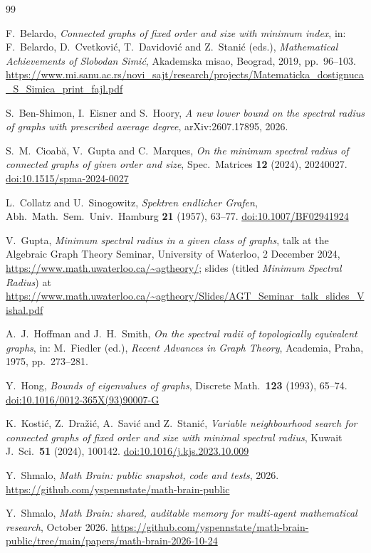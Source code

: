 \documentclass[11pt]{article}
\theoremstyle{definition}
\theoremstyle{remark}
\providecommand{\doi}[1]{\href{https://doi.org/#1}{doi:#1}}
\begin{document}
\begin{thebibliography}{99}

F.~Belardo, \emph{Connected graphs of fixed order and size with minimum index}, in: F.~Belardo, D.~Cvetkovi\'c,
T.~Davidovi\'c and Z.~Stani\'c (eds.), \emph{Mathematical Achievements of Slobodan Simi\'c}, Akademska misao, Beograd,
2019, pp.~96--103.
\url{https://www.mi.sanu.ac.rs/novi_sajt/research/projects/Matematicka_dostignuca_S_Simica_print_fajl.pdf}

S.~Ben-Shimon, I.~Eisner and S.~Hoory, \emph{A new lower bound on the spectral radius of graphs with prescribed average
degree}, arXiv:2607.17895, 2026.

S.~M.~Cioab\u{a}, V.~Gupta and C.~Marques, \emph{On the minimum spectral radius of connected graphs of given order and
size}, Spec.\ Matrices \textbf{12} (2024), 20240027. \doi{10.1515/spma-2024-0027}

L.~Collatz and U.~Sinogowitz, \emph{Spektren endlicher Grafen}, Abh.\ Math.\ Sem.\ Univ.\ Hamburg \textbf{21} (1957),
63--77. \doi{10.1007/BF02941924}

V.~Gupta, \emph{Minimum spectral radius in a given class of graphs}, talk at the Algebraic Graph Theory Seminar,
University of Waterloo, 2 December 2024, \url{https://www.math.uwaterloo.ca/~agtheory/}; slides (titled
\emph{Minimum Spectral Radius}) at
\url{https://www.math.uwaterloo.ca/~agtheory/Slides/AGT_Seminar_talk_slides_Vishal.pdf}

A.~J.~Hoffman and J.~H.~Smith, \emph{On the spectral radii of topologically equivalent graphs}, in: M.~Fiedler (ed.),
\emph{Recent Advances in Graph Theory}, Academia, Praha, 1975, pp.~273--281.

Y.~Hong, \emph{Bounds of eigenvalues of graphs}, Discrete Math.\ \textbf{123} (1993), 65--74.
\doi{10.1016/0012-365X(93)90007-G}

K.~Kosti\'c, Z.~Dra\v{z}i\'c, A.~Savi\'c and Z.~Stani\'c, \emph{Variable neighbourhood search for connected graphs of
fixed order and size with minimal spectral radius}, Kuwait J.\ Sci.\ \textbf{51} (2024), 100142.
\doi{10.1016/j.kjs.2023.10.009}

Y.~Shmalo, \emph{Math Brain: public snapshot, code and tests}, 2026.
\url{https://github.com/yspennstate/math-brain-public}

Y.~Shmalo, \emph{Math Brain: shared, auditable memory for multi-agent mathematical research}, October 2026.
\url{https://github.com/yspennstate/math-brain-public/tree/main/papers/math-brain-2026-10-24}


\end{thebibliography}
\end{document}
